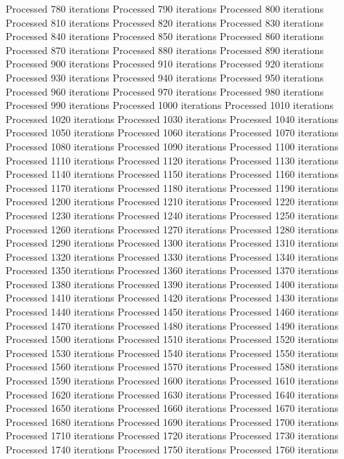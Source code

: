 \begin{pyprint}
Processed 780 iterations
Processed 790 iterations
Processed 800 iterations
Processed 810 iterations
Processed 820 iterations
Processed 830 iterations
Processed 840 iterations
Processed 850 iterations
Processed 860 iterations
Processed 870 iterations
Processed 880 iterations
Processed 890 iterations
Processed 900 iterations
Processed 910 iterations
Processed 920 iterations
Processed 930 iterations
Processed 940 iterations
Processed 950 iterations
Processed 960 iterations
Processed 970 iterations
Processed 980 iterations
Processed 990 iterations
Processed 1000 iterations
Processed 1010 iterations
Processed 1020 iterations
Processed 1030 iterations
Processed 1040 iterations
Processed 1050 iterations
Processed 1060 iterations
Processed 1070 iterations
Processed 1080 iterations
Processed 1090 iterations
Processed 1100 iterations
Processed 1110 iterations
Processed 1120 iterations
Processed 1130 iterations
Processed 1140 iterations
Processed 1150 iterations
Processed 1160 iterations
Processed 1170 iterations
Processed 1180 iterations
Processed 1190 iterations
Processed 1200 iterations
Processed 1210 iterations
Processed 1220 iterations
Processed 1230 iterations
Processed 1240 iterations
Processed 1250 iterations
Processed 1260 iterations
Processed 1270 iterations
Processed 1280 iterations
Processed 1290 iterations
Processed 1300 iterations
Processed 1310 iterations
Processed 1320 iterations
Processed 1330 iterations
Processed 1340 iterations
Processed 1350 iterations
Processed 1360 iterations
Processed 1370 iterations
Processed 1380 iterations
Processed 1390 iterations
Processed 1400 iterations
Processed 1410 iterations
Processed 1420 iterations
Processed 1430 iterations
Processed 1440 iterations
Processed 1450 iterations
Processed 1460 iterations
Processed 1470 iterations
Processed 1480 iterations
Processed 1490 iterations
Processed 1500 iterations
Processed 1510 iterations
Processed 1520 iterations
Processed 1530 iterations
Processed 1540 iterations
Processed 1550 iterations
Processed 1560 iterations
Processed 1570 iterations
Processed 1580 iterations
Processed 1590 iterations
Processed 1600 iterations
Processed 1610 iterations
Processed 1620 iterations
Processed 1630 iterations
Processed 1640 iterations
Processed 1650 iterations
Processed 1660 iterations
Processed 1670 iterations
Processed 1680 iterations
Processed 1690 iterations
Processed 1700 iterations
Processed 1710 iterations
Processed 1720 iterations
Processed 1730 iterations
Processed 1740 iterations
Processed 1750 iterations
Processed 1760 iterations

\end{pyprint}
